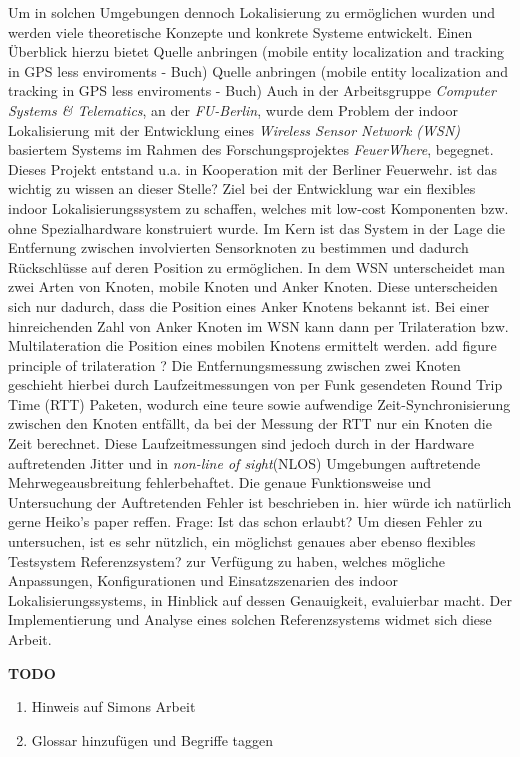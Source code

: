 Um in solchen Umgebungen dennoch Lokalisierung zu ermöglichen wurden und werden viele theoretische Konzepte und 
konkrete Systeme entwickelt. Einen Überblick hierzu bietet
{\color{red}Quelle anbringen (mobile entity localization and tracking in GPS less enviroments - Buch)}
Quelle anbringen (mobile entity localization and tracking in GPS less enviroments - Buch)
Auch in der Arbeitsgruppe \textit{Computer Systems \& Telematics}, an der \textit{FU-Berlin}, 
wurde dem Problem der indoor Lokalisierung mit der Entwicklung eines \textit{Wireless Sensor Network (WSN)}
basiertem Systems im Rahmen des Forschungsprojektes \textit{FeuerWhere}, begegnet. 
Dieses Projekt entstand u.a. in Kooperation mit der Berliner Feuerwehr.
{\color{red}ist das wichtig zu wissen an dieser Stelle?}
Ziel bei der Entwicklung war ein flexibles indoor Lokalisierungssystem zu schaffen, welches mit
low-cost Komponenten bzw. ohne Spezialhardware konstruiert wurde. 
Im Kern ist das System in der Lage die Entfernung zwischen involvierten Sensorknoten zu bestimmen und 
dadurch Rückschlüsse auf deren Position zu ermöglichen. 
In dem WSN unterscheidet man zwei Arten von Knoten, mobile Knoten und Anker Knoten. 
Diese unterscheiden sich nur dadurch, dass die Position eines Anker Knotens bekannt ist.
Bei einer hinreichenden Zahl von Anker Knoten im WSN kann dann per Trilateration bzw. Multilateration 
die Position eines mobilen Knotens ermittelt werden.
{\color{red} add figure principle of trilateration ?}
Die Entfernungsmessung zwischen zwei Knoten geschieht hierbei durch Laufzeitmessungen von per Funk gesendeten
Round Trip Time (RTT) Paketen, wodurch eine teure sowie aufwendige Zeit-Synchronisierung zwischen den Knoten entfällt,
da bei der Messung der RTT nur ein Knoten die Zeit berechnet.
Diese Laufzeitmessungen sind jedoch durch in der Hardware auftretenden Jitter und 
in \textit{non-line of sight}(NLOS) Umgebungen auftretende Mehrwegeausbreitung fehlerbehaftet. 
Die genaue Funktionsweise und Untersuchung der Auftretenden Fehler ist beschrieben in.
{\color{red} hier würde ich natürlich gerne Heiko's paper reffen. Frage: Ist das schon erlaubt?}
Um diesen Fehler zu untersuchen, ist es sehr nützlich, ein möglichst genaues aber ebenso flexibles Testsystem
{\color{red}Referenzsystem?} zur Verfügung zu haben, welches mögliche Anpassungen, Konfigurationen und 
Einsatzszenarien des indoor Lokalisierungssystems, in Hinblick auf dessen Genauigkeit, evaluierbar macht.
Der Implementierung und Analyse eines solchen Referenzsystems widmet sich diese Arbeit. 

\textbf{TODO}
\begin{enumerate}
  \item Hinweis auf Simons Arbeit
  \item Glossar hinzufügen und Begriffe taggen
\end{enumerate}


